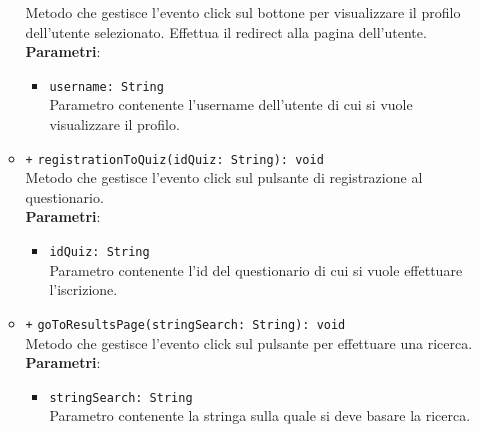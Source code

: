 \begin{itemize}
\begin{itemize}
		Metodo che gestisce l'evento click sul bottone per visualizzare il profilo dell'utente selezionato. Effettua il redirect alla pagina dell'utente.\\
		\textbf{Parametri}:
		\begin{itemize}
			\item \texttt{username: String} \\
			Parametro contenente l'username dell'utente di cui si vuole visualizzare il profilo.
		\end{itemize} 
		\item \texttt{+} \texttt{registrationToQuiz(idQuiz: String): void} \\
		Metodo che gestisce l'evento click sul pulsante di registrazione al questionario.\\
		\textbf{Parametri}:
		\begin{itemize}
			\item \texttt{idQuiz: String} \\
			Parametro contenente l'id del questionario di cui si vuole effettuare l'iscrizione.
		\end{itemize} 
		\item \texttt{+} \texttt{goToResultsPage(stringSearch: String): void} \\
		Metodo che gestisce l'evento click sul pulsante per effettuare una ricerca.\\
		\textbf{Parametri}:
		\begin{itemize}
			\item \texttt{stringSearch: String} \\
			Parametro contenente la stringa sulla quale si deve basare la ricerca.
		\end{itemize} 
	\end{itemize}
\end{itemize}

